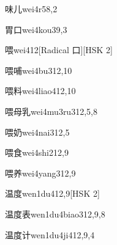 \begin{entry}{味儿}{wei4r5}{8,2}
\end{entry}

\begin{entry}{胃口}{wei4kou3}{9,3}
\end{entry}

\begin{entry}{喂}{wei4}{12}[Radical 口][HSK 2]
\end{entry}

\begin{entry}{喂哺}{wei4bu3}{12,10}
\end{entry}

\begin{entry}{喂料}{wei4liao4}{12,10}
\end{entry}

\begin{entry}{喂母乳}{wei4mu3ru3}{12,5,8}
\end{entry}

\begin{entry}{喂奶}{wei4nai3}{12,5}
\end{entry}

\begin{entry}{喂食}{wei4shi2}{12,9}
\end{entry}

\begin{entry}{喂养}{wei4yang3}{12,9}
\end{entry}

\begin{entry}{温度}{wen1du4}{12,9}[HSK 2]
\end{entry}

\begin{entry}{温度表}{wen1du4biao3}{12,9,8}
\end{entry}

\begin{entry}{温度计}{wen1du4ji4}{12,9,4}
\end{entry}

